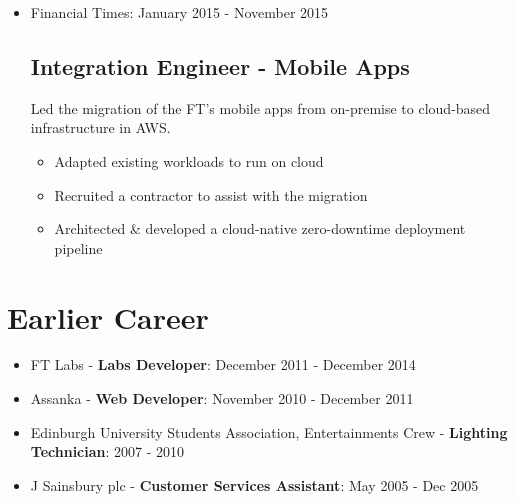\documentclass[a4paper]{article}
\newenvironment{detail}{\begin{adjustwidth}{10pt}{}}{\end{adjustwidth}}
\begin{document}
\begin{itemize}
\item Financial Times: January 2015 - November 2015
\subsection*{Integration Engineer - Mobile Apps}
\begin{detail}
Led the migration of the FT's mobile apps from on-premise to cloud-based infrastructure in AWS.
\begin{itemize}
	\item Adapted existing workloads to run on cloud
	\item Recruited a contractor to assist with the migration
	\item Architected \& developed a cloud-native zero-downtime deployment pipeline
\end{itemize}
\end{detail}

\end{itemize}

\section*{Earlier Career}
\begin{itemize}

\item FT Labs - {\bf Labs Developer}: December 2011 - December 2014
\item Assanka - {\bf Web Developer}: November 2010 - December 2011
\item Edinburgh University Students Association, Entertainments Crew - {\bf Lighting Technician}: 2007 - 2010
\item J Sainsbury plc - {\bf Customer Services Assistant}: May 2005 - Dec 2005

\end{itemize}
\end{document}
